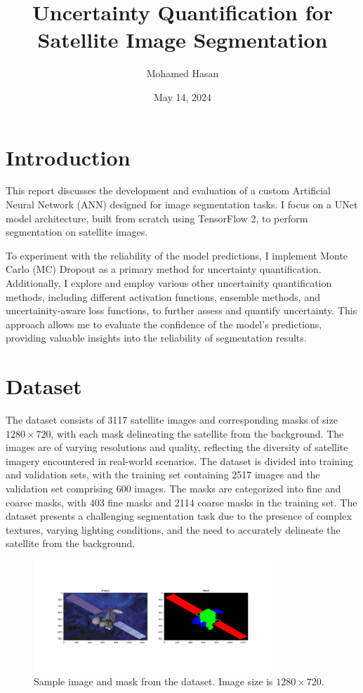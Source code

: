 \documentclass{article}
\title{Uncertainty Quantification for Satellite Image Segmentation}
\author{Mohamed Hasan}
\date{May 14, 2024}
\begin{document}
\maketitle

\section{Introduction}


This report discusses the development and evaluation of a custom Artificial Neural Network (ANN) designed for image 
segmentation tasks. I focus on a UNet model architecture, built from scratch using TensorFlow 2, to perform segmentation 
on satellite images. 

To experiment with the reliability of the model predictions, I implement Monte Carlo (MC) Dropout as a 
primary method for uncertainty quantification. Additionally, I explore and employ various other uncertainity quantification 
methods, including different activation functions, ensemble methods, and uncertainity-aware loss functions, to further 
assess and quantify uncertainty. This approach allows me to evaluate the confidence of the model’s predictions, providing 
valuable insights into the reliability of segmentation results.


\section{Dataset}
The dataset consists of 3117 satellite images and corresponding masks of size $1280 \times 720$, with each 
mask delineating the satellite from the background. The images are of varying resolutions and quality, 
reflecting the diversity of satellite imagery encountered in real-world scenarios. The dataset is divided 
into training and validation sets, with the training set containing 2517 images and the validation set
comprising 600 images. The masks are categorized into fine and coarse masks, with 403 fine masks
and 2114 coarse masks in the training set. The dataset presents a challenging segmentation task due
to the presence of complex textures, varying lighting conditions, and the need to accurately
delineate the satellite from the background.

\begin{figure}[h]
    \centering
    \includegraphics[width=0.8\textwidth]{../images/original_input_sample.png}
    \caption{Sample image and mask from the dataset. Image size is $1280 \times 720$.}
    \label{fig:original_dataset}
\end{figure}
\end{document}
